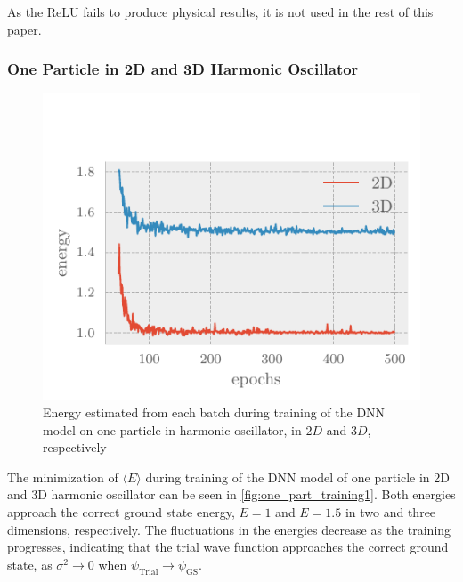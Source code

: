 As the ReLU fails to produce physical results, it is not used in the rest of
this paper.

\subsubsection{One Particle in 2D and 3D Harmonic Oscillator}

\begin{figure}[H]
	\includegraphics[]{figures/one_part_training2.pdf}
	\caption{Energy estimated from each batch during training of the DNN model on one particle in harmonic oscillator, in $2D$ and $3D$, respectively}
	\label{fig:one_part_training2}
\end{figure}

The minimization of $\langle E \rangle$ during training of the DNN model of
one particle in 2D and 3D harmonic oscillator can be seen in
\autoref{fig:one_part_training1}. Both energies approach the correct ground
state energy, $E=1$ and $E=1.5$ in two and three dimensions, respectively. The
fluctuations in the energies decrease as the training progresses, indicating that the trial wave function approaches
the correct ground state, as $\sigma^2 \to 0$ when $\psi_{\text{Trial}} \to \psi_{\text{GS}}$.   


